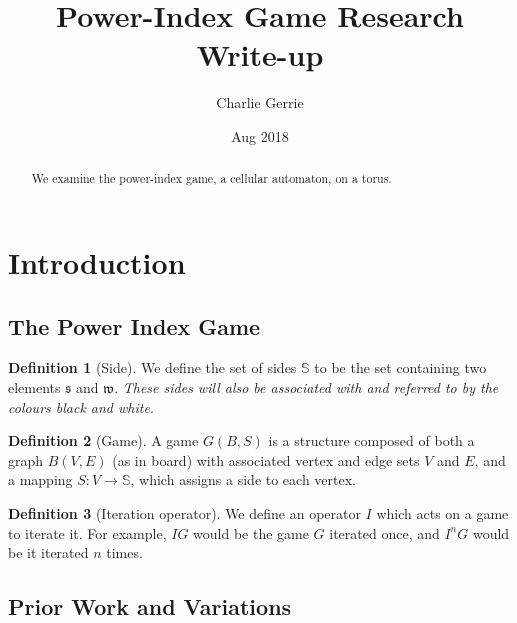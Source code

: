 \documentclass[12pt]{article}
\title{Power-Index Game Research Write-up}
\date{Aug 2018}
\author{Charlie Gerrie}
\theoremstyle{definition}
\newtheorem{definition}{Definition}%
\theoremstyle{remark}
\theoremstyle{remark}
\begin{document}
\maketitle
\newpage

\begin{abstract}
We examine the power-index game, a cellular automaton, on a torus. 
\end{abstract}

\tableofcontents

\section{Introduction} \label{IntroSec}

\subsection{The Power Index Game} \label{PIgame}

\begin{definition}[Side]
We define the set of sides $\mathbb{S}$ to be the set containing two elements $\mathfrak{s}$ and $\mathfrak{w}$. \textit{These sides will also be associated with and referred to by the colours black and white}.
\end{definition}

\begin{definition}[Game]
A game $G(B,S)$ is a structure composed of both a graph $B(V,E)$ (as in board) with associated vertex and edge sets $V$ and $E$, and a mapping $S\colon V \to \mathbb{S}$, which assigns a side to each vertex.
\end{definition}

\begin{definition}[Iteration operator]
We define an operator $I$ which acts on a game to iterate it. For example, $IG$ would be the game $G$ iterated once, and $I^n G$ would be it iterated $n$ times.
\end{definition}

\subsection{Prior Work and Variations} \label{PriorWork}

\end{document}
